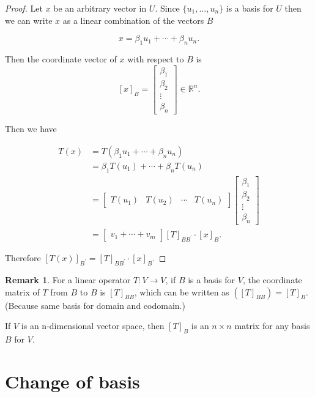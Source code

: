 \documentclass[12pt]{article}
\theoremstyle{definition}
\newtheorem*{remark}{Remark}
\begin{document}
\begin{proof}
Let $x$ be an arbitrary vector in $U$. Since $\{u_1, \ldots, u_n \}$ is a basis for $U$
then we can write $x$ as a linear combination of the vectors $B$

\[ x = \beta_1 u_1 + \cdots + \beta_n u_n. \]

Then the coordinate vector of $x$ with respect to $B$ is
\[ [x]_B =
\begin{bmatrix}
\beta_1 \\
\beta_2 \\
\vdots \\
\beta_n
\end{bmatrix}
\in \mathbb{R}^n.
\]


Then we have

\begin{align*}
T(x) &= T(\beta_1 u_1 + \cdots + \beta_n u_n) \\
&= \beta_1 T(u_1) + \cdots + \beta_n T(u_n) \\
&= \begin{bmatrix} T(u_1) & T(u_2) & \cdots & T(u_n) \end{bmatrix}
\begin{bmatrix}
\beta_1 \\
\beta_2 \\
\vdots \\
\beta_n
\end{bmatrix} \\
&= \begin{bmatrix} v_1 + \cdots + v_m \end{bmatrix} [T]_{BB^{\prime}} \cdot [x]_B.
\end{align*}

Therefore $[T(x)]_{B^{\prime}} = [T]_{BB^{\prime}} \cdot [x]_B$.
\end{proof}

\begin{remark}
For a linear operator $T: V \rightarrow V$, if $B$ is a basis for $V$, the coordinate
matrix of $T$ from $B$ to $B$ is $[T]_{BB}$, which can be written as
$([T]_{BB}) = [T]_B$. (Because same basis for domain and codomain.)

If $V$ is an n-dimensional vector space, then $[T]_B$ is an $n \times n$ matrix for
any basis $B$ for $V$.
\end{remark}

\section{Change of basis}
\end{document}
